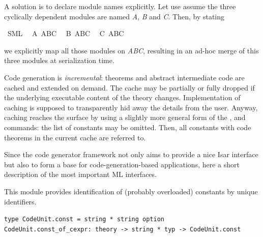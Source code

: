 \begin{isabellebody}
\begin{isamarkuptext}
  A solution is to declare module names explicitly.
  Let use assume the three cyclically dependent
  modules are named \emph{A}, \emph{B} and \emph{C}.
  Then, by stating%
\end{isamarkuptext}%
\isamarkuptrue%
\isamarkupfalse%
\ SML\isanewline
\ \ A\ ABC\isanewline
\ \ B\ ABC\isanewline
\ \ C\ ABC%
\begin{isamarkuptext}%
we explicitly map all those modules on \emph{ABC},
  resulting in an ad-hoc merge of this three modules
  at serialization time.%
\end{isamarkuptext}%
\isamarkuptrue%
%
\isamarkuptrue%
%
\begin{isamarkuptext}%
Code generation is \emph{incremental}: theorems
  and abstract intermediate code are cached and extended on demand.
  The cache may be partially or fully dropped if the underlying
  executable content of the theory changes.
  Implementation of caching is supposed to transparently
  hid away the details from the user.  Anyway, caching
  reaches the surface by using a slightly more general form
  of the \isa{{\isasymCODETHMS}}, \isa{{\isasymCODEDEPS}}
  and \isa{{\isasymEXPORTCODE}} commands: the list of constants
  may be omitted.  Then, all constants with code theorems
  in the current cache are referred to.%
\end{isamarkuptext}%
\isamarkuptrue%
%
\isamarkuptrue%
%
\begin{isamarkuptext}%
\fixme%
\end{isamarkuptext}%
\isamarkuptrue%
%
\isamarkuptrue%
%
\begin{isamarkuptext}%
Since the code generator framework not only aims to provide
  a nice Isar interface but also to form a base for
  code-generation-based applications, here a short
  description of the most important ML interfaces.%
\end{isamarkuptext}%
\isamarkuptrue%
%
\isamarkuptrue%
%
\begin{isamarkuptext}%
This module provides identification of (probably overloaded)
  constants by unique identifiers.%
\end{isamarkuptext}%
\isamarkuptrue%
%
\isadelimmlref
%
\endisadelimmlref
%
\isatagmlref
%
\begin{isamarkuptext}%
\begin{mldecls}
  \verb|type CodeUnit.const = string * string option| \\
  \verb|CodeUnit.const_of_cexpr: theory -> string * typ -> CodeUnit.const| \\
 \end{mldecls}


\end{isamarkuptext}
\end{isabellebody}
